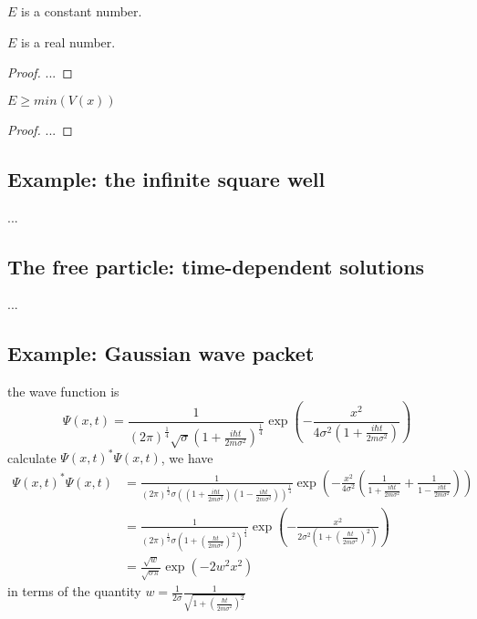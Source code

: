 \begin{remark}
    $E$ is a constant number.
\end{remark}
\begin{remark}
    $E$ is a real number.
\end{remark}
\begin{proof}
    ...
\end{proof}
\begin{remark}
    $E \geq min(V(x))$
\end{remark}
\begin{proof}
    ...
\end{proof}
\subsection{Example: the infinite square well}
...

\subsection{The free particle: time-dependent solutions}
...

\subsection{Example: Gaussian wave packet}
the wave function is
$$
    \Psi(x, t)=\frac{1}{(2 \pi)^{\frac{1}{4}} \sqrt{\sigma}\left(1+\frac{i \hbar t}{2 m \sigma^{2}}\right)^{\frac{1}{4}}} \exp \left(-\frac{x^{2}}{4 \sigma^{2}\left(1+\frac{i \hbar t}{2 m \sigma^{2}}\right)}\right)
$$
calculate $\Psi(x,t)^*\Psi(x,t)$, we have
\begin{align*}
    \Psi(x,t)^*\Psi(x,t) & =  \frac{1}{(2 \pi)^{\frac{1}{2}} \sigma \left(\left(1+\frac{i \hbar t}{2 m \sigma^{2}}\right) \left(1-\frac{i \hbar t}{2 m \sigma^{2}}\right)\right)^{\frac{1}{4}}} \exp(-\frac{x^2}{4\sigma^2} (\frac{1}{1+\frac{i \hbar t}{2 m \sigma^2}}+\frac{1}{1-\frac{i \hbar t}{2 m \sigma^2}})) \\
                         & =  \frac{1}{(2 \pi)^\frac{1}{2} \sigma (1+(\frac{\hbar t}{2 m \sigma^2})^2)^\frac{1}{4}} \exp(-\frac{x^2}{2 \sigma^2 (1+(\frac{\hbar t}{2 m \sigma^2})^2)})                                                                                                                               \\
                         & = \frac{\sqrt{w}}{\sqrt{\sigma \pi}} \exp(-2 w^2 x^2)
\end{align*}
in terms of the quantity $w = \frac{1}{2 \sigma} \frac{1}{\sqrt{1+(\frac{\hbar t}{2 m \sigma^2})^2}}$
